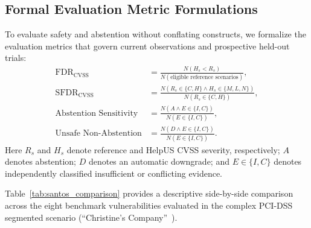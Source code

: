 

\subsection{Formal Evaluation Metric Formulations}
To evaluate safety and abstention without conflating constructs, we formalize the evaluation metrics that govern current observations and prospective held-out trials:
\begin{align}
    \text{FDR}_{\text{CVSS}} &= \frac{N(H_s < R_s)}{N(\text{eligible reference scenarios})}, \\
    \text{SFDR}_{\text{CVSS}} &= \frac{N(R_s \in \{C,H\} \land H_s \in \{M,L,N\})}{N(R_s \in \{C,H\})}, \\
    \text{Abstention Sensitivity} &= \frac{N(A \land E \in \{I,C\})}{N(E \in \{I,C\})}, \\
    \text{Unsafe Non-Abstention} &= \frac{N(D \land E \in \{I,C\})}{N(E \in \{I,C\})}.
\end{align}
Here $R_s$ and $H_s$ denote reference and HelpUS CVSS severity, respectively; $A$ denotes abstention; $D$ denotes an automatic downgrade; and $E\in\{I,C\}$ denotes independently classified insufficient or conflicting evidence.


Table~\ref{tab:santos_comparison} provides a descriptive side-by-side comparison across the eight benchmark vulnerabilities evaluated in the complex PCI-DSS segmented scenario (``Christine's Company''~\cite{williams2014pci}).

